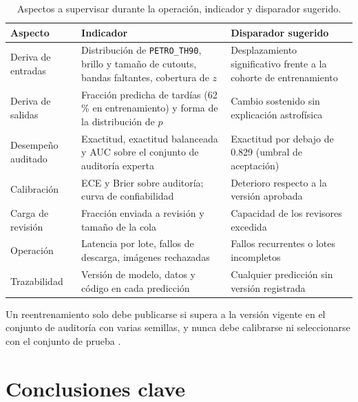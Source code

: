 \documentclass[letterpaper,11pt]{article}
\begin{document}
\begin{table}[H]
  \centering
  \caption{Aspectos a supervisar durante la operación, indicador y disparador sugerido.}
  \label{tab:monitoreo}
  \small
  \begin{tabular}{p{3.0cm}p{6.2cm}p{5.2cm}}
    \toprule
    Aspecto & Indicador & Disparador sugerido \\
    \midrule
    Deriva de entradas & Distribución de \texttt{PETRO\_TH90}, brillo y tamaño de cutouts, bandas faltantes, cobertura de $z$ & Desplazamiento significativo frente a la cohorte de entrenamiento \\
    Deriva de salidas & Fracción predicha de tardías (62\,\% en entrenamiento) y forma de la distribución de $p$ & Cambio sostenido sin explicación astrofísica \\
    Desempeño auditado & Exactitud, exactitud balanceada y AUC sobre el conjunto de auditoría experta & Exactitud por debajo de 0.829 (umbral de aceptación) \\
    Calibración & ECE y Brier sobre auditoría; curva de confiabilidad & Deterioro respecto a la versión aprobada \\
    Carga de revisión & Fracción enviada a revisión y tamaño de la cola & Capacidad de los revisores excedida \\
    Operación & Latencia por lote, fallos de descarga, imágenes rechazadas & Fallos recurrentes o lotes incompletos \\
    Trazabilidad & Versión de modelo, datos y código en cada predicción & Cualquier predicción sin versión registrada \\
    \bottomrule
  \end{tabular}
\end{table}

Un reentrenamiento solo debe publicarse si supera a la versión vigente en el conjunto de auditoría con varias semillas, y nunca debe calibrarse ni seleccionarse con el conjunto de prueba \parencite{guo2017, sculley2015}.

\section{Conclusiones clave}
\label{sec:conclusiones}
\end{document}
